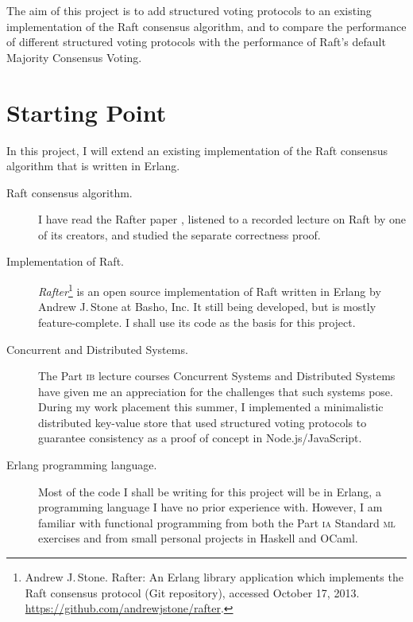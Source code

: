 \documentclass[12pt,chapterprefix=true,toc=bibliography,numbers=noendperiod,
               footnotes=multiple,twoside]{scrreprt}
\begin{document}
The aim of this project is to add structured voting protocols to an existing implementation of the Raft consensus algorithm, and to compare the performance of different structured voting protocols with the performance of Raft's default Majority Consensus Voting.


\section*{Starting Point%
  \label{starting-point}%
}
%

In this project, I will extend an existing implementation of the Raft consensus algorithm that is written in Erlang.

\begin{description}

\item[Raft consensus algorithm.] I have read the Rafter paper \autocite{raft}, listened to a recorded lecture on Raft by one of its creators, and studied the separate correctness proof.

\item[Implementation of Raft.] \emph{Rafter}\footnote{Andrew J.\,Stone. Rafter: An Erlang library application which implements the Raft consensus protocol (Git repository), accessed October 17, 2013. \url{https://github.com/andrewjstone/rafter}.} is an open source implementation of Raft written in Erlang by Andrew J.\,Stone at Basho, Inc. It still being developed, but is mostly feature-complete. I shall use its code as the basis for this project.

\item[Concurrent and Distributed Systems.] The Part \textsc{ib} lecture courses Concurrent Systems and Distributed Systems have given me an appreciation for the challenges that such systems pose. During my work placement this summer, I implemented a minimalistic distributed key-value store that used structured voting protocols to guarantee consistency as a proof of concept in Node.js/JavaScript.

\item[Erlang programming language.] Most of the code I shall be writing for this project will be in Erlang, a programming language I have no prior experience with. However, I am familiar with functional programming from both the Part \textsc{ia} Standard \textsc{ml} exercises and from small personal projects in Haskell and OCaml.

\end{description}
\end{document}
